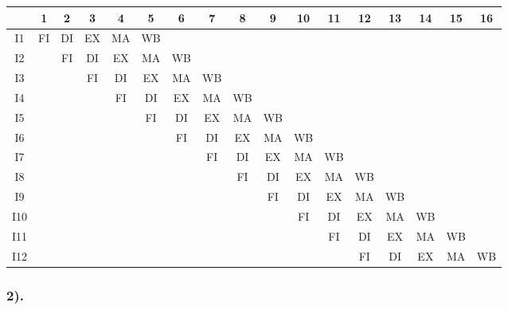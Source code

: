 \documentclass[11pt]{article}  %
\begin{document}
\begin{table}[H]
    \centering
    \begin{tabular}{|c|c|c|c|c|c|c|c|c|c|c|c|c|c|c|c|c|}
        \hline
            & 1  & 2  & 3  & 4  & 5  & 6  & 7  & 8  & 9  & 10 & 11 & 12 & 13 & 14 & 15 & 16                      \\ \hline
        I1  & FI & DI & EX & MA & WB &    &    &    &    &    &    &    &    &    &    &                         \\ \hline
        I2  &    & FI & DI & EX & MA & WB &    &    &    &    &    &    &    &    &    &                         \\ \hline
        I3  &    &    & FI & DI & EX & MA & WB &    &    &    &    &    &    &    &    &                         \\ \hline
        I4  &    &    &    & FI & DI & EX & MA & WB &    &    &    &    &    &    &    &                         \\ \hline
        I5  &    &    &    &    & FI & DI & EX & MA & WB &    &    &    &    &    &    &                         \\ \hline
        I6  &    &    &    &    &    & FI & DI & EX & MA & WB &    &    &    &    &    &                         \\ \hline
        I7  &    &    &    &    &    &    & FI & DI & EX & MA & WB &    &    &    &    &                         \\ \hline
        I8  &    &    &    &    &    &    &    & FI & DI & EX & MA & WB &    &    &    &                         \\ \hline
        I9  &    &    &    &    &    &    &    &    & FI & DI & EX & MA & WB &    &    &                         \\ \hline
        I10 &    &    &    &    &    &    &    &    &    & FI & DI & EX & MA & WB &    &                         \\ \hline
        I11 &    &    &    &    &    &    &    &    &    &    & FI & DI & EX & MA & WB &                         \\ \hline
        I12 &    &    &    &    &    &    &    &    &    &    &    & FI & DI & EX & MA & WB                      \\ \hline
    \end{tabular}
\end{table}

\subsubsection*{2). }
\end{document}

